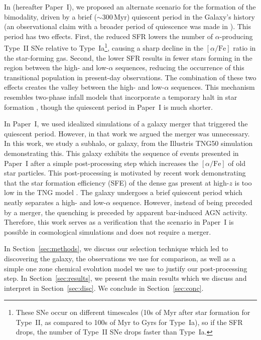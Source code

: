 \documentclass[twocolumn]{aastex631}
\newcommand{\Myr}{\ensuremath{\textrm{Myr}}}
\newcommand{\alphaFe}{\ensuremath{[\alpha/\textrm{Fe}]}}
\begin{document}
In \citet{2024arXiv240707985B} (hereafter Paper~I), we proposed an alternate scenario for the formation of the bimodality, driven by a brief ($\sim300\,\Myr$) quiescent period in the Galaxy's history (an observational claim with a broader period of quiescence was made in \citet{2016A&A...589A..66H}). This period has two effects. First, the reduced SFR lowers the number of $\alpha$-producing Type~II SNe relative to Type~Ia\footnote{These SNe occur on different timescales (10s of Myr after star formation for Type~II, as compared to 100s of Myr to Gyrs for Type~Ia), so if the SFR drops, the number of Type~II SNe drops faster than Type~Ia.}, causing a sharp decline in the \alphaFe{} ratio in the star-forming gas. Second, the lower SFR results in fewer stars forming in the region between the high- and low-$\alpha$ sequences, reducing the occurrence of this transitional population in present-day observations. The combination of these two effects creates the valley between the high- and low-$\alpha$ sequences. This mechanism resembles two-phase infall models that incorporate a temporary halt in star formation \citep[][and references therein]{2024arXiv240511025S}, though the quiescent period in Paper~I is much shorter.

In Paper~I, we used idealized simulations of a galaxy merger that triggered the quiescent period. However, in that work we argued the merger was unnecessary. In this work, we study a subhalo, or galaxy, from the Illustris TNG50 simulation demonstrating this. This galaxy exhibits the sequence of events presented in Paper~I after a simple post-processing step which increases the \alphaFe{} of old star particles. This post-processing is motivated by recent work demonstrating that the star formation efficiency (SFE) of the dense gas present at high-$z$ is too low in the TNG model \citep{2024arXiv240909121H}. The galaxy undergoes a brief quiescent period which neatly separates a high- and low-$\alpha$ sequence. However, instead of being preceded by a merger, the quenching is preceded by apparent bar-induced AGN activity. Therefore, this work serves as a verification that the scenario in Paper~I is possible in cosmological simulations and does not require a merger.

In Section~\ref{sec:methods}, we discuss our selection technique which led to discovering the galaxy, the observations we use for comparison, as well as a simple one zone chemical evolution model we use to justify our post-processing step. In Section~\ref{sec:results}, we present the main results which we discuss and interpret in Section~\ref{sec:disc}. We conclude in Section~\ref{sec:conc}.
\end{document}
